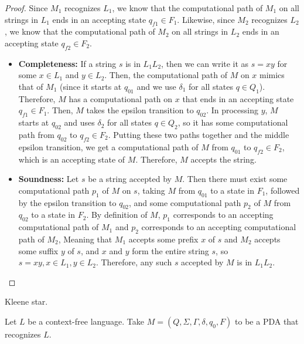 \begin{problem}
\begin{enumalph}
\begin{Answer}
\begin{claim}
\begin{proof}
            \step
            Since $M_1$ recognizes $L_1$, we know that the computational path of
            $M_1$ on all strings in $L_1$ ends in an accepting state $q_{f1} \in F_1$.
            Likewise, since $M_2$ recognizes $L_2$, we know that the computational path of
            $M_2$ on all strings in $L_2$ ends in an accepting state $q_{f2} \in F_2$.
            
            \begin{itemize}
              \item \textbf{Completeness:} If a string $s$ is in $L_1L_2$,
                then we can write it as $s = xy$ for some $x \in L_1$ and $y \in L_2$.
                Then, the computational path of $M$ on $x$ mimics that of $M_1$
                (since it starts at $q_{01}$ and we use $\delta_1$ for all states $q \in Q_1$).
                Therefore, $M$ has a computational path on $x$ that ends in an accepting state $q_{f1} \in F_1$.
                Then, $M$ takes the epsilon transition to $q_{02}$.
                In processing $y$, $M$ starts at $q_{02}$ and uses $\delta_2$ for all states $q \in Q_2$,
                so it has some computational path from $q_{02}$ to $q_{f2} \in F_2$.
                Putting these two paths together and the middle epsilon transition,
                we get a computational path of $M$ from $q_{01}$ to $q_{f2} \in F_2$,
                which is an accepting state of $M$.
                Therefore, $M$ accepts the string.
              \item \textbf{Soundness:} Let $s$ be a string accepted by $M$.
                Then there must exist some computational path $p_1$ of $M$ on $s$, taking $M$ from
                $q_{01}$ to a state in $F_1$, followed by the epsilon transition to $q_{02}$,
                and some computational path $p_2$ of $M$ from $q_{02}$ to a state in $F_2$.
                By definition of $M$, $p_1$ corresponds to an accepting
                computational path of $M_1$ and $p_2$ corresponds to an accepting
                computational path of $M_2$,
                Meaning that $M_1$ accepts some prefix $x$ of $s$ and $M_2$ accepts some suffix $y$ of $s$,
                and $x$ and $y$ form the entire string $s$, so $s = xy, x \in L_1, y \in L_2$.
                Therefore, any such $s$ accepted by $M$ is in $L_1L_2$.
            \end{itemize}
          \end{proof}
        \end{claim}
      \end{Answer}
    \item Kleene star.
      \begin{Answer}
        Let $L$ be a context-free language.
        Take $M = (Q, \Sigma, \Gamma, \delta, q_0, F)$ to be a PDA that recognizes $L$.


\end{Answer}
\end{enumalph}
\end{problem}
